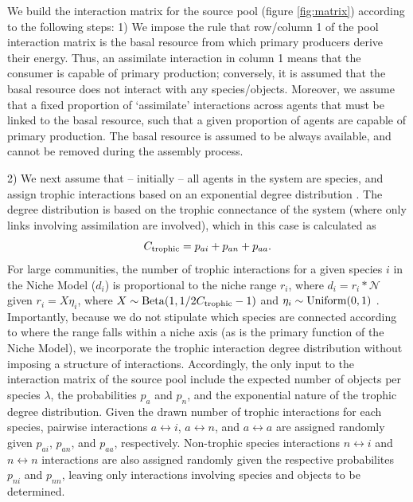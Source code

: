 \documentclass[twocolumn,preprintnumbers,amsmath,amssymb,superscriptaddress]{revtex4}
\begin{document}
We build the interaction matrix for the source pool (figure \ref{fig:matrix}) according to the following steps:
1) We impose the rule that row/column 1 of the pool interaction matrix is the basal resource from which primary producers derive their energy.
Thus, an assimilate interaction in column 1 means that the consumer is capable of primary production; conversely, it is assumed that the basal resource does not interact with any species/objects.
Moreover, we assume that a fixed proportion of `assimilate' interactions across agents that must be linked to the basal resource, such that a given proportion of agents are capable of primary production.
The basal resource is assumed to be always available, and cannot be removed during the assembly process.

2) We next assume that -- initially -- all agents in the system are species, and assign trophic interactions based on an exponential degree distribution \cite{Williams:2000wt}.
The degree distribution is based on the trophic connectance of the system (where only links involving assimilation are involved), which in this case is calculated as 
\begin{equation}
  C_{\rm trophic} = p_{ai}+p_{an}+p_{aa}.
\end{equation}
For large communities, the number of trophic interactions for a given species $i$ in the Niche Model ($d_i$) is proportional to the niche range $r_i$, where $d_i = r_i*\mathcal{N}$ given $r_i = X\eta_i$, where $X \sim {\rm Beta}(1,1/2C_{\rm trophic} - 1)$ and $\eta_i \sim {\rm Uniform}(0,1)$ \cite{Williams:2000wt}. %
Importantly, because we do not stipulate which species are connected according to where the range falls within a niche axis (as is the primary function of the Niche Model), we incorporate the trophic interaction degree distribution without imposing a structure of interactions.
Accordingly, the only input to the interaction matrix of the source pool include the expected number of objects per species $\lambda$, the probabilities $p_a$ and $p_n$, and the exponential nature of the trophic degree distribution.
Given the drawn number of trophic interactions for each species, pairwise interactions $a \leftrightarrow i$, $a \leftrightarrow n$, and $a \leftrightarrow a$ are assigned randomly given $p_{ai}$, $p_{an}$, and $p_{aa}$, respectively.
Non-trophic species interactions $n \leftrightarrow i$ and $n \leftrightarrow n$ interactions are also assigned randomly given the respective probabilites $p_{ni}$ and $p_{nn}$, leaving only interactions involving species and objects to be determined.
\end{document}
